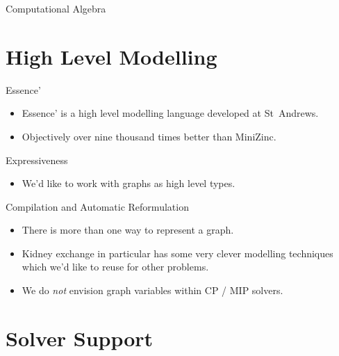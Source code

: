 \documentclass{beamer}
\begin{document}
\begin{frame}{Computational Algebra}
\end{frame}

\section{High Level Modelling}

\begin{frame}{Essence'}
    \begin{itemize}
        \item Essence' is a high level modelling language developed at St~Andrews.
        \item Objectively over nine thousand times better than MiniZinc.
    \end{itemize}
\end{frame}

\begin{frame}{Expressiveness}
    \begin{itemize}
        \item We'd like to work with graphs as high level types.
    \end{itemize}
\end{frame}

\begin{frame}{Compilation and Automatic Reformulation}
    \begin{itemize}
        \item There is more than one way to represent a graph.
        \item Kidney exchange in particular has some very clever modelling techniques which we'd
            like to reuse for other problems.
        \item We do \emph{not} envision graph variables within CP / MIP solvers.
    \end{itemize}
\end{frame}

\section{Solver Support}
\end{document}
